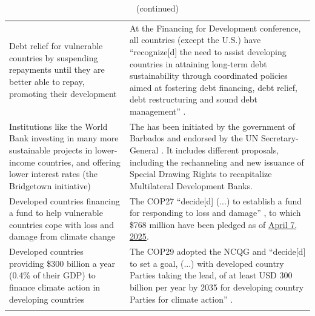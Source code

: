 \begin{table}[H]
\caption*{(continued)}
\begin{tabular}{p{5cm}p{11cm}}
Debt relief for vulnerable countries by suspending repayments until they are better able to repay, promoting their development  & At the Financing for Development conference, all countries (except the U.S.) have ``recognize[d] the need to assist developing countries in attaining long-term debt sustainability through coordinated policies aimed at fostering debt financing, debt relief, debt restructuring and sound debt management'' \citep{ffd4_outcome_2025}. \\ %
Institutions like the World Bank investing in many more sustainable projects in lower-income countries, and offering lower interest rates (the Bridgetown initiative)  & The \cite{bridgetown_initiative_bridgetown_2025} has been initiated by the government of Barbados and endorsed by the UN Secretary-General \citep{un_press_2023}. It includes different proposals, including the rechanneling and new issuance of Special Drawing Rights to recapitalize Multilateral Development Banks. \\ \addlinespace 
Developed countries financing a fund to help vulnerable countries cope with loss and damage from climate change  & The COP27 ``decide[d] (...) to establish a fund for responding to loss and damage'' \citep{cop27_decision_2022}, to which \$768 million have been pledged as of \href{https://unfccc.int/event/pledges-to-the-fund-for-responding-to-loss-and-damage}{April 7, 2025}. \\ \addlinespace 
Developed countries providing \$300 billion a year (0.4\% of their GDP) to finance climate action in developing countries  & The COP29 adopted the NCQG and ``decide[d] to set a goal, (...) with developed country Parties taking the lead, of at least USD 300 billion per year by 2035 for developing country Parties for climate action'' \citep{unfccc_new_2024}. \\ \addlinespace 

\end{tabular}
\end{table}
